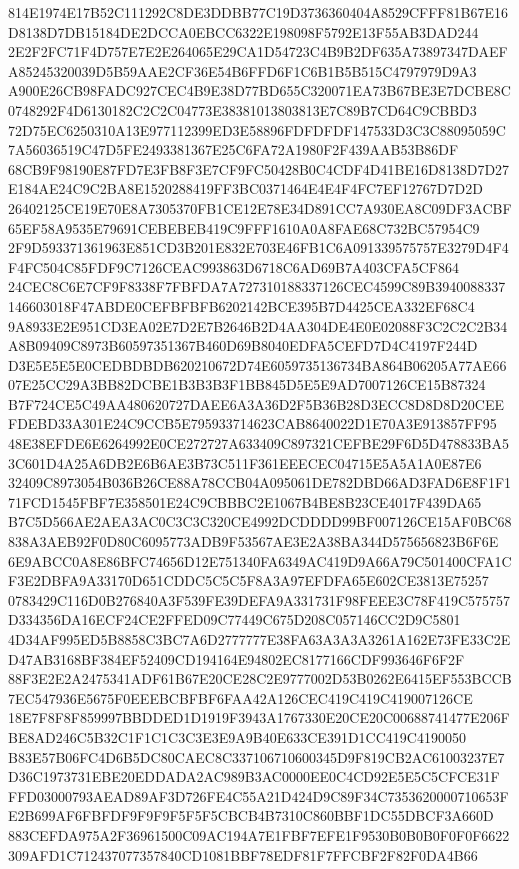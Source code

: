 \documentclass[UTF8,fontset=fandol,zihao=-4,a4paper]{ctexart}
\begin{document}
{{814E1974E17B52C111292C8DE3DDBB77C19D3736360404A8529CFFF81B67E16D8138D7DB15184DE2DCCA0EBCC6322E198098F5792E13F55AB3DAD244
2E2F2FC71F4D757E7E2E264065E29CA1D54723C4B9B2DF635A73897347DAEFA85245320039D5B59AAE2CF36E54B6FFD6F1C6B1B5B515C4797979D9A3
A900E26CB98FADC927CEC4B9E38D77BD655C320071EA73B67BE3E7DCBE8C0748292F4D6130182C2C2C04773E38381013803813E7C89B7CD64C9CBBD3
72D75EC6250310A13E977112399ED3E58896FDFDFDF147533D3C3C88095059C7A56036519C47D5FE2493381367E25C6FA72A1980F2F439AAB53B86DF
68CB9F98190E87FD7E3FB8F3E7CF9FC50428B0C4CDF4D41BE16D8138D7D27E184AE24C9C2BA8E1520288419FF3BC0371464E4E4F4FC7EF12767D7D2D
26402125CE19E70E8A7305370FB1CE12E78E34D891CC7A930EA8C09DF3ACBF65EF58A9535E79691CEBEBEB419C9FFF1610A0A8FAE68C732BC57954C9
2F9D593371361963E851CD3B201E832E703E46FB1C6A091339575757E3279D4F4F4FC504C85FDF9C7126CEAC993863D6718C6AD69B7A403CFA5CF864
24CEC8C6E7CF9F8338F7FBFDA7A727310188337126CEC4599C89B3940088337146603018F47ABDE0CEFBFBFB6202142BCE395B7D4425CEA332EF68C4
9A8933E2E951CD3EA02E7D2E7B2646B2D4AA304DE4E0E02088F3C2C2C2B34A8B09409C8973B60597351367B460D69B8040EDFA5CEFD7D4C4197F244D
D3E5E5E5E0CEDBDBDB620210672D74E6059735136734BA864B06205A77AE6607E25CC29A3BB82DCBE1B3B3B3F1BB845D5E5E9AD7007126CE15B87324
B7F724CE5C49AA480620727DAEE6A3A36D2F5B36B28D3ECC8D8D8D20CEEFDEBD33A301E24C9CCB5E795933714623CAB8640022D1E70A3E913857FF95
48E38EFDE6E6264992E0CE272727A633409C897321CEFBE29F6D5D478833BA53C601D4A25A6DB2E6B6AE3B73C511F361EEECEC04715E5A5A1A0E87E6
32409C8973054B036B26CE88A78CCB04A095061DE782DBD66AD3FAD6E8F1F171FCD1545FBF7E358501E24C9CBBBC2E1067B4BE8B23CE4017F439DA65
B7C5D566AE2AEA3AC0C3C3C320CE4992DCDDDD99BF007126CE15AF0BC68838A3AEB92F0D80C6095773ADB9F53567AE3E2A38BA344D575656823B6F6E
6E9ABCC0A8E86BFC74656D12E751340FA6349AC419D9A66A79C501400CFA1CF3E2DBFA9A33170D651CDDC5C5C5F8A3A97EFDFA65E602CE3813E75257
0783429C116D0B276840A3F539FE39DEFA9A331731F98FEEE3C78F419C575757D334356DA16ECF24CE2FFED09C77449C675D208C057146CC2D9C5801
4D34AF995ED5B8858C3BC7A6D2777777E38FA63A3A3A3261A162E73FE33C2ED47AB3168BF384EF52409CD194164E94802EC8177166CDF993646F6F2F
88F3E2E2A2475341ADF61B67E20CE28C2E9777002D53B0262E6415EF553BCCB7EC547936E5675F0EEEBCBFBF6FAA42A126CEC419C419C419007126CE
18E7F8F8F859997BBDDED1D1919F3943A1767330E20CE20C00688741477E206FBE8AD246C5B32C1F1C1C3C3E3E9A9B40E633CE391D1CC419C4190050
B83E57B06FC4D6B5DC80CAEC8C337106710600345D9F819CB2AC61003237E7D36C1973731EBE20EDDADA2AC989B3AC0000EE0C4CD92E5E5C5CFCE31F
FFD03000793AEAD89AF3D726FE4C55A21D424D9C89F34C7353620000710653FE2B699AF6FBFDF9F9F9F5F5F5CBCB4B7310C860BBF1DC55DBCF3A660D
883CEFDA975A2F36961500C09AC194A7E1FBF7EFE1F9530B0B0B0F0F0F6622309AFD1C712437077357840CD1081BBF78EDF81F7FFCBF2F82F0DA4B66
}}
\end{document}
